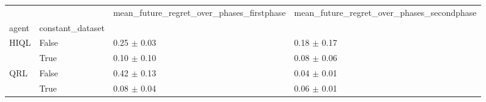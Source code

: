 \begin{tabular}{llll}
\toprule
 &  & mean_future_regret_over_phases_firstphase & mean_future_regret_over_phases_secondphase \\
agent & constant_dataset &  &  \\
\midrule
\multirow[t]{2}{*}{HIQL} & False & 0.25 $\pm$ 0.03 & 0.18 $\pm$ 0.17 \\
 & True & 0.10 $\pm$ 0.10 & 0.08 $\pm$ 0.06 \\
\cline{1-4}
\multirow[t]{2}{*}{QRL} & False & 0.42 $\pm$ 0.13 & 0.04 $\pm$ 0.01 \\
 & True & 0.08 $\pm$ 0.04 & 0.06 $\pm$ 0.01 \\
\cline{1-4}
\bottomrule
\end{tabular}
